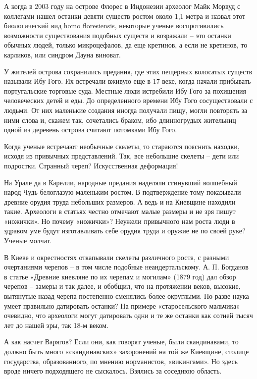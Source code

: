 А когда в 2003 году на острове Флорес в Индонезии археолог Майк Морвуд с коллегами нашел останки девяти существ ростом около 1,1 метра и назвал этот биологический вид homo floresiensis, некоторые ученые воспротивились возможности существования подобных существ и возражали – это останки обычных людей, только микроцефалов, да еще кретинов, а если не кретинов, то карликов, или синдром Дауна виноват.

У жителей острова сохранились предания, где этих пещерных волосатых существ называли Ибу Гого. Их встречали вживую еще в 17 веке, когда начали прибывать португальские торговые суда. Местные люди истребили Ибу Гого за похищения человеческих детей и еды. До определенного времени Ибу Гого сосуществовали с людьми. От них маленькие создания иногда получали пищу, могли повторять за ними слова и, скажем так, сочетались браком, ибо длинногрудых жительниц одной из деревень острова считают потомками Ибу Гого.

Когда ученые встречают необычные скелеты, то стараются пояснить находки, исходя из привычных представлений. Так, все небольшие скелеты – дети или подростки. Странный череп? Искусственная деформация!
 
На Урале да в Карелии, народные предания наделяли сгинувший волшебный народ Чудь белоглазую маленьким ростом. В подтверждение тому показывали древние орудия труда небольших размеров. А ведь и на Киевщине находили такие. Археологи в статьях честно отмечают малые размеры и не зря пишут «ножички». Но почему «ножички»? Неужели привычного нам роста люди в здравом уме будут изготавливать себе орудия труда и оружие не по своей руке? Ученые молчат.

В Киеве и окрестностях откапывали скелеты различного роста, с разными очертаниями черепов – в том числе подобные неандертальскому. А. П. Богданов в статье «Древние киевляне по их черепам и могилам» (1879 год) дал обзор черепов – замеры и так далее, и обобщил, что на протяжении веков, высокие, вытянутые назад черепа постепенно сменялись более округлыми. Но разве наука умеет правильно датировать останки? На примере «старосельского мальчика» очевидно, что археологи могут датировать одни и те же останки как сотней тысяч лет до нашей эры, так 18-м веком.

А как насчет Варягов? Если они, как говорят ученые, были скандинавами, то должно быть много «скандинавских» захоронений на той же Киевщине, столице государства, образованного, по мнению норманистов, «викингами». Но здесь вроде ничего  подходящего не сыскалось. Взялись за соседнюю область.

